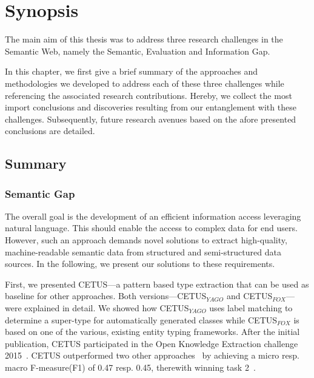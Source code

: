 \chapter{Synopsis}





The main aim of this thesis was to address three research challenges in the Semantic Web, namely the Semantic, Evaluation and Information Gap.

In this chapter, we first give a brief summary of the approaches and methodologies we developed to address each of these three challenges while referencing the associated research contributions.
Hereby, we collect the most import conclusions and discoveries resulting from our entanglement with these challenges.
Subsequently, future research avenues based on the afore presented conclusions are detailed.
 
\section{Summary}
\subsection*{Semantic Gap}

The overall goal is the development of an efficient information access leveraging natural language.
This should enable the access to complex data for end users.
However, such an approach demands novel solutions to extract high-quality, machine-readable semantic data from structured and semi-structured data sources. 
In the following, we present our solutions to these requirements.

First, we presented CETUS---a pattern based type extraction that can be used as baseline for other approaches.
Both versions---CETUS$_{YAGO}$ and CETUS$_{FOX}$---were explained in detail.
We showed how CETUS$_{YAGO}$ uses label matching to determine a super-type for automatically generated classes while CETUS$_{FOX}$ is based on one of the various, existing entity typing frameworks.
After the initial publication, CETUS participated in the Open Knowledge Extraction challenge 2015~\cite{okechallenge}.
CETUS outperformed two other approaches~\cite{fred_typing,oak_sheffield} by achieving a  micro resp. macro F-measure(F1) of 0.47 resp. 0.45, therewith winning task 2~\cite{okechallenge}.	


